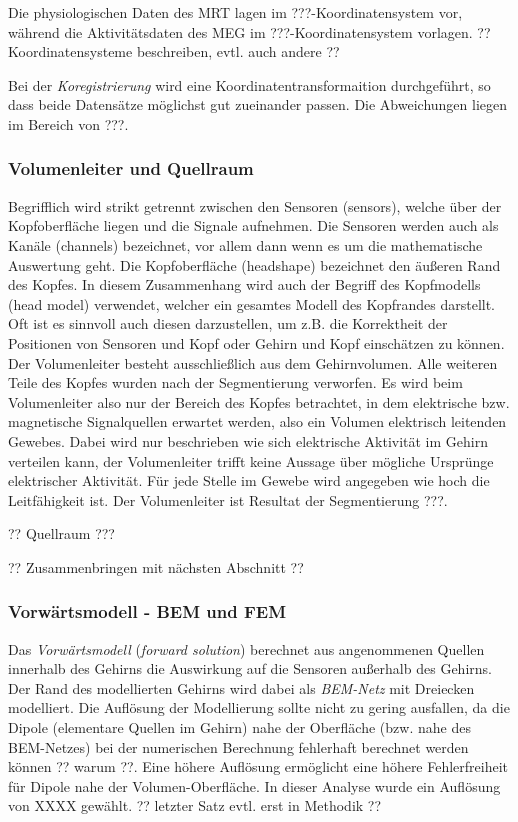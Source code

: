 \documentclass[doc,a4paper,12pt]{apa6}
\begin{document}
Die physiologischen Daten des MRT lagen im ???-Koordinatensystem vor, während die Aktivitätsdaten des MEG im ???-Koordinatensystem vorlagen. ?? Koordinatensysteme beschreiben, evtl. auch andere ??

Bei der \emph{Koregistrierung} wird eine Koordinatentransformaition durchgeführt, so dass beide Datensätze möglichst gut zueinander passen. Die Abweichungen liegen im Bereich von ???.

\subsubsection{Volumenleiter und Quellraum}

Begrifflich wird strikt getrennt zwischen den Sensoren (sensors), welche über der Kopfoberfläche liegen und die Signale aufnehmen. Die Sensoren werden auch als Kanäle (channels) bezeichnet, vor allem dann wenn es um die mathematische Auswertung geht. Die Kopfoberfläche (headshape) bezeichnet den äußeren Rand des Kopfes. In diesem Zusammenhang wird auch der Begriff des Kopfmodells (head model) verwendet, welcher ein gesamtes Modell des Kopfrandes darstellt. Oft ist es sinnvoll auch diesen darzustellen, um z.B. die Korrektheit der Positionen von Sensoren und Kopf oder Gehirn und Kopf einschätzen zu können. Der Volumenleiter besteht ausschließlich aus dem Gehirnvolumen. Alle weiteren Teile des Kopfes wurden nach der Segmentierung verworfen. Es wird beim Volumenleiter also nur der Bereich des Kopfes betrachtet, in dem elektrische bzw. magnetische Signalquellen erwartet werden, also ein Volumen elektrisch leitenden Gewebes. Dabei wird nur beschrieben wie sich elektrische Aktivität im Gehirn verteilen kann, der Volumenleiter trifft keine Aussage über mögliche Ursprünge elektrischer Aktivität. Für jede Stelle im Gewebe wird angegeben wie hoch die Leitfähigkeit ist. Der Volumenleiter ist Resultat der Segmentierung ???.

?? Quellraum ???

?? Zusammenbringen mit nächsten Abschnitt ??

\subsubsection{Vorwärtsmodell - BEM und FEM}

Das \emph{Vorwärtsmodell} (\emph{forward solution}) berechnet aus angenommenen Quellen innerhalb des Gehirns die Auswirkung auf die Sensoren außerhalb des Gehirns. Der Rand des modellierten Gehirns wird dabei als \emph{BEM-Netz} mit Dreiecken modelliert. Die Auflösung der Modellierung sollte nicht zu gering ausfallen, da die Dipole (elementare Quellen im Gehirn) nahe der Oberfläche (bzw. nahe des BEM-Netzes) bei der numerischen Berechnung fehlerhaft berechnet werden können ?? warum ??. Eine höhere Auflösung ermöglicht eine höhere Fehlerfreiheit für Dipole nahe der Volumen-Oberfläche. In dieser Analyse wurde ein Auflösung von XXXX gewählt. ?? letzter Satz evtl. erst in Methodik ??
\end{document}
